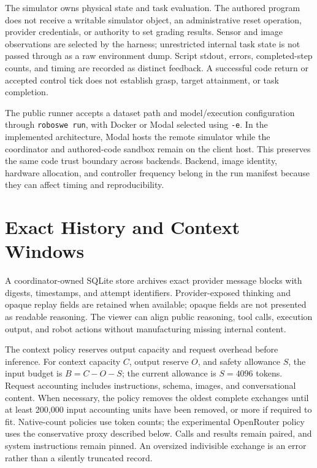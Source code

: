 \documentclass[11pt]{article}
\begin{document}
The simulator owns physical state and task evaluation. The authored program does not receive a writable simulator object, an administrative reset operation, provider credentials, or authority to set grading results. Sensor and image observations are selected by the harness; unrestricted internal task state is not passed through as a raw environment dump. Script stdout, errors, completed-step counts, and timing are recorded as distinct feedback. A successful code return or accepted control tick does not establish grasp, target attainment, or task completion.

The public runner accepts a dataset path and model/execution configuration through \texttt{roboswe run}, with Docker or Modal selected using \texttt{-e}. In the implemented architecture, Modal hosts the remote simulator while the coordinator and authored-code sandbox remain on the client host. This preserves the same code trust boundary across backends. Backend, image identity, hardware allocation, and controller frequency belong in the run manifest because they can affect timing and reproducibility.

\section{Exact History and Context Windows}
A coordinator-owned SQLite store archives exact provider message blocks with digests, timestamps, and attempt identifiers. Provider-exposed thinking and opaque replay fields are retained when available; opaque fields are not presented as readable reasoning. The viewer can align public reasoning, tool calls, execution output, and robot actions without manufacturing missing internal content.

The context policy reserves output capacity and request overhead before inference. For context capacity $C$, output reserve $O$, and safety allowance $S$, the input budget is $B=C-O-S$; the current allowance is $S=4096$ tokens. Request accounting includes instructions, schema, images, and conversational content. When necessary, the policy removes the oldest complete exchanges until at least 200,000 input accounting units have been removed, or more if required to fit. Native-count policies use token counts; the experimental OpenRouter policy uses the conservative proxy described below. Calls and results remain paired, and system instructions remain pinned. An oversized indivisible exchange is an error rather than a silently truncated record.
\end{document}
